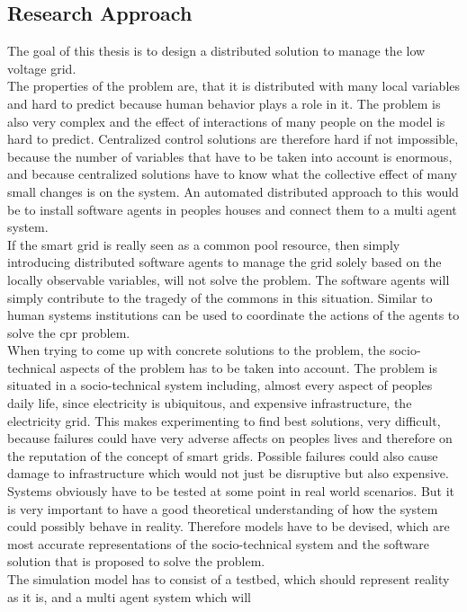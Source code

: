 \documentclass[a4paper]{article}
\begin{document}
\subsection{Research Approach}
The goal of this thesis is to design a distributed solution to manage the low voltage grid. \\
The properties of the problem are, that it is distributed with many local variables and hard to predict because human behavior plays a role
in it. The problem is also very complex and the effect of interactions of many people on the model is hard to predict. Centralized control
solutions are therefore hard if not impossible, because the number of variables that have to be taken into account is enormous, and
because centralized solutions have to know what the collective effect of many small changes is on the system. An automated distributed 
approach to this would be to install software agents in peoples houses and connect them to a multi agent system.\\
If the smart grid is really seen as a common pool resource, then simply introducing distributed software 
agents to manage the grid solely based on the locally observable variables, will not solve the problem.
The software agents will simply contribute to the tragedy of the commons in this situation. 
Similar to human systems institutions can be used to coordinate the actions of the agents to 
solve the cpr problem. \\
 When trying to come up with concrete solutions to the problem, the socio-technical aspects of the problem has to be taken into account.
The problem is situated in a socio-technical system including, almost every aspect of peoples daily life, 
since electricity is ubiquitous, and expensive infrastructure, the electricity grid. This makes experimenting to find 
best solutions, very difficult, because failures could have very adverse affects on peoples lives and therefore on the 
reputation of the concept of smart grids. Possible failures could also cause damage to infrastructure which would not just
be disruptive but also expensive. Systems obviously have to be tested at some point in real world scenarios. But it is 
very important to have a good theoretical understanding of how the system could possibly behave in reality. Therefore 
models have to be devised, which are most accurate representations of the socio-technical system and the 
software solution that is proposed to solve the problem. \\
The simulation model has to consist of a testbed, which should represent reality as it is, and a multi agent system which will 
\end{document}
